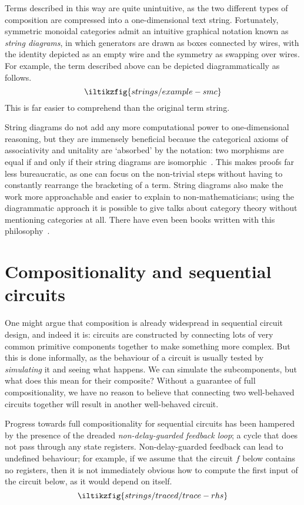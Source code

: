 Terms described in this way are quite unintuitive, as the two different types of
composition are compressed into a one-dimensional text string.
Fortunately, symmetric monoidal categories admit an intuitive graphical notation
known as \emph{string diagrams}, in which generators are drawn as boxes
connected by wires, with the identity depicted as an empty wire and the symmetry
as swapping over wires.
For example, the term described above can be depicted diagrammatically as
follows.
\[
    \iltikzfig{strings/example-smc}
\]
This is far easier to comprehend than the original term string.

String diagrams do not add any more computational power to one-dimensional
reasoning, but they are
immensely beneficial because the categorical axioms of associativity and
unitality are `absorbed' by the notation: two morphisms are equal if and only if
their string diagrams are isomorphic~\cite{kelly1980coherence,kissinger2014abstract,selinger2011survey}.
This makes proofs far less bureaucratic, as one can focus on the non-trivial
steps without having to constantly rearrange the bracketing of a term.
String diagrams also make the work more approachable and easier to explain to
non-mathematicians; using the diagrammatic approach it is possible to give talks
about category theory without mentioning categories at all.
There have even been books written with this
philosophy~\cite{coecke2018picturing}.


\section{Compositionality and sequential circuits}

One might argue that composition is already widespread in sequential circuit
design, and indeed it is: circuits are constructed by connecting lots of very
common primitive components together to make something more complex.
But this is done informally, as the behaviour of a circuit is usually tested
by \emph{simulating} it and seeing what happens.
We can simulate the subcomponents, but what does this mean for their composite?
Without a guarantee of full compositionality, we have no reason to
believe that connecting two well-behaved circuits together will result in
another well-behaved circuit.

Progress towards full compositionality for sequential circuits has been hampered
by the presence of the dreaded \emph{non-delay-guarded feedback loop}; a cycle
that does not pass through any state registers.
Non-delay-guarded feedback can lead to undefined behaviour; for example, if we
assume that the circuit \(f\) below contains no registers, then it is not
immediately obvious how to compute the first input of the circuit below, as it
would depend on itself.
\[
    \iltikzfig{strings/traced/trace-rhs}
\]

